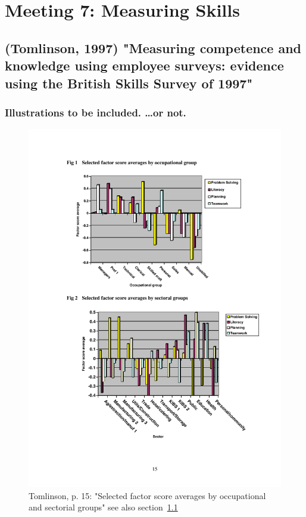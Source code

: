 \documentclass[12pt,a4paper]{article}
\begin{document}
  \section{Meeting 7: Measuring Skills} %
  \label{sec:Meeting 7}
    \subsection{(Tomlinson, 1997) "Measuring competence and knowledge using employee surveys: evidence using the British Skills Survey of 1997"}
    \label{sec:Tomlinson1997}


  \subsubsection{Illustrations to be included. …or not.}
    \begin{figure}[htb]
      \centering
      \includegraphics[width=\textwidth]{Meeting 7 dp50 - Seite 15.pdf}
      \caption{Tomlinson, p. 15: "Selected factor score averages by occupational and sectorial groups" see also section~\ref{sec:Tomlinson1997}}
      \label{fig:Tomlinson factorscores}
    \end{figure}
\end{document}
